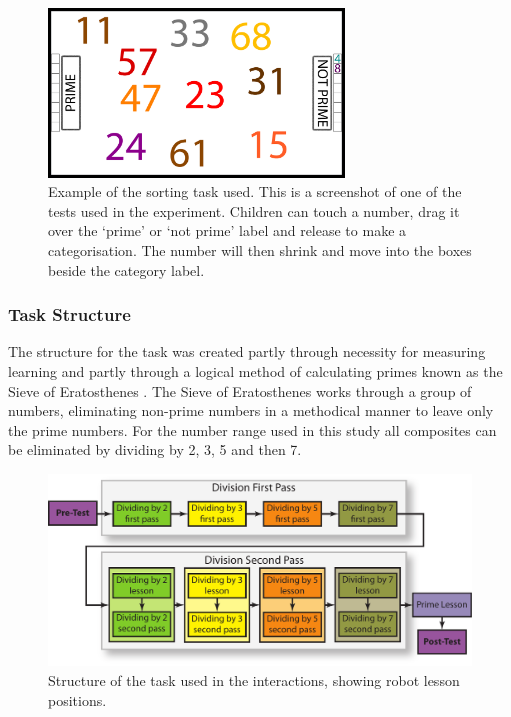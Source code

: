 \begin{figure}[t!]
    \centering
    \includegraphics[width=0.7\textwidth]{images/ch7_pretest.png}
    \caption{Example of the sorting task used. This is a screenshot of one of the tests used in the experiment. Children can touch a number, drag it over the `prime' or `not prime' label and release to make a categorisation. The number will then shrink and move into the boxes beside the category label.}
    \label{fig:ch7_task}
\end{figure}

\subsubsection{Task Structure}\label{sec:socasoc-taskstruct}
The structure for the task was created partly through necessity for measuring \gls{learning} and partly through a logical method of calculating primes known as the Sieve of Eratosthenes \citep{oneill2009sieve}. The Sieve of Eratosthenes works through a group of numbers, eliminating non-prime numbers in a methodical manner to leave only the prime numbers. For the number range used in this study all composites can be eliminated by dividing by 2, 3, 5 and then 7.

\begin{figure}[t!]
    \centering
    \includegraphics[width=1.0\textwidth]{images/ch7_task_structure.pdf}
    \caption{Structure of the task used in the interactions, showing robot lesson positions.}
    \label{fig:ch7_structure}
\end{figure}

